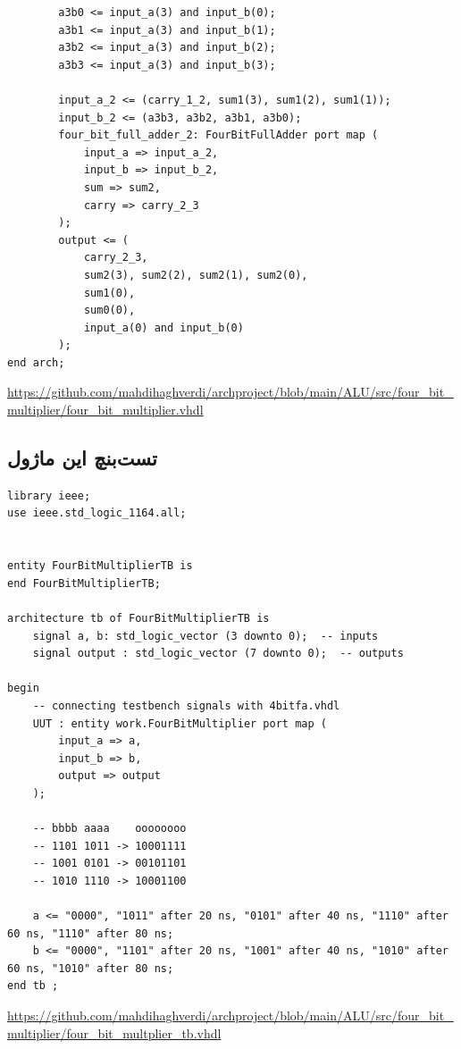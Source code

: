 \documentclass[dvipsnames, svgnames, x11names, a4paper, 11pt, oneside]{book}
\begin{document}
\begin{latin}
\begin{lstlisting}
		a3b0 <= input_a(3) and input_b(0);
		a3b1 <= input_a(3) and input_b(1);
		a3b2 <= input_a(3) and input_b(2);
		a3b3 <= input_a(3) and input_b(3);
		
		input_a_2 <= (carry_1_2, sum1(3), sum1(2), sum1(1));
		input_b_2 <= (a3b3, a3b2, a3b1, a3b0);
		four_bit_full_adder_2: FourBitFullAdder port map (
			input_a => input_a_2,
			input_b => input_b_2,
			sum => sum2,
			carry => carry_2_3
		);
		output <= (
			carry_2_3,
			sum2(3), sum2(2), sum2(1), sum2(0),
			sum1(0),
			sum0(0),
			input_a(0) and input_b(0)
		);
end arch;
						\end{lstlisting}
						\url{https://github.com/mahdihaghverdi/archproject/blob/main/ALU/src/four_bit_multiplier/four_bit_multiplier.vhdl}
					\end{latin}
				\subsection{تست‌بنچ این ماژول}
					\begin{latin}
						
						\begin{lstlisting}
library ieee;
use ieee.std_logic_1164.all;


entity FourBitMultiplierTB is
end FourBitMultiplierTB;

architecture tb of FourBitMultiplierTB is
	signal a, b: std_logic_vector (3 downto 0);  -- inputs
	signal output : std_logic_vector (7 downto 0);  -- outputs

begin
	-- connecting testbench signals with 4bitfa.vhdl
	UUT : entity work.FourBitMultiplier port map (
		input_a => a,
		input_b => b,
		output => output
	);
	
	-- bbbb aaaa    oooooooo
	-- 1101 1011 -> 10001111
	-- 1001 0101 -> 00101101
	-- 1010 1110 -> 10001100
	
	a <= "0000", "1011" after 20 ns, "0101" after 40 ns, "1110" after 60 ns, "1110" after 80 ns;
	b <= "0000", "1101" after 20 ns, "1001" after 40 ns, "1010" after 60 ns, "1010" after 80 ns;
end tb ;
						\end{lstlisting}
						\url{https://github.com/mahdihaghverdi/archproject/blob/main/ALU/src/four_bit_multiplier/four_bit_multplier_tb.vhdl}
					\end{latin}
\end{document}
